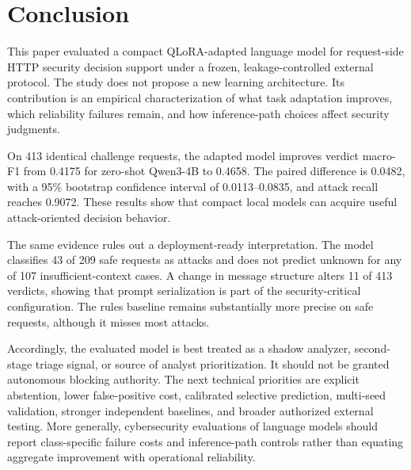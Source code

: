\section{Conclusion}
\label{sec:conclusion}

This paper evaluated a compact QLoRA-adapted language model for request-side HTTP security decision support under a frozen, leakage-controlled external protocol. The study does not propose a new learning architecture. Its contribution is an empirical characterization of what task adaptation improves, which reliability failures remain, and how inference-path choices affect security judgments.

On 413 identical challenge requests, the adapted model improves verdict macro-F1 from 0.4175 for zero-shot Qwen3-4B to 0.4658. The paired difference is 0.0482, with a 95\% bootstrap confidence interval of 0.0113--0.0835, and attack recall reaches 0.9072. These results show that compact local models can acquire useful attack-oriented decision behavior.

The same evidence rules out a deployment-ready interpretation. The model classifies 43 of 209 safe requests as attacks and does not predict unknown for any of 107 insufficient-context cases. A change in message structure alters 11 of 413 verdicts, showing that prompt serialization is part of the security-critical configuration. The rules baseline remains substantially more precise on safe requests, although it misses most attacks.

Accordingly, the evaluated model is best treated as a shadow analyzer, second-stage triage signal, or source of analyst prioritization. It should not be granted autonomous blocking authority. The next technical priorities are explicit abstention, lower false-positive cost, calibrated selective prediction, multi-seed validation, stronger independent baselines, and broader authorized external testing. More generally, cybersecurity evaluations of language models should report class-specific failure costs and inference-path controls rather than equating aggregate improvement with operational reliability.
